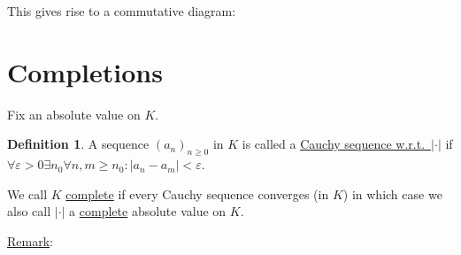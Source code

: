 \documentclass[openany]{amsbook}
\numberwithin{section}{chapter}
\theoremstyle{definition}
\newtheorem*{definition}{Definition}
\begin{document}
This gives rise to a commutative diagram:

\begin{center}
\end{center}

\section{Completions}

Fix an absolute value on \(K\).

\begin{definition}
    A sequence \((a_n)_{n\geq 0}\) in \(K\) is called a \underline{Cauchy sequence w.r.t.\ \(\vert \cdot \vert\)} if \(\forall \varepsilon > 0 \exists n_0 \forall n, m \geq n_0 : \vert a_n - a_m \vert < \varepsilon\).

    We call \(K\) \underline{complete} if every Cauchy sequence converges (in \(K\)) in which case we also call \(\vert \cdot \vert \) a \underline{complete} absolute value on \(K\).
\end{definition}

\underline{Remark}:
\end{document}
